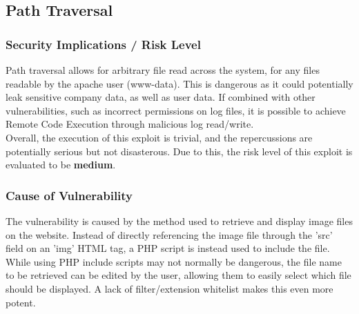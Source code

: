 \documentclass{report}
\begin{document}
\subsection{Path Traversal}
\subsubsection{Security Implications / Risk Level}
Path traversal allows for arbitrary file read across the system, for any files readable by the apache user (www-data). This is dangerous as it could potentially leak sensitive company data, as well as user data. If combined with other vulnerabilities, such as incorrect permissions on log files, it is possible to achieve Remote Code Execution through malicious log read/write.\\
Overall, the execution of this exploit is trivial, and the repercussions are potentially serious but not disasterous. Due to this, the risk level of this exploit is evaluated to be \textbf{medium}.
\subsubsection{Cause of Vulnerability}
The vulnerability is caused by the method used to retrieve and display image files on the website. Instead of directly referencing the image file through the 'src' field on an 'img' HTML tag, a PHP script is instead used to include the file.\\ 
While using PHP include scripts may not normally be dangerous, the file name to be retrieved can be edited by the user, allowing them to easily select which file should be displayed. A lack of filter/extension whitelist makes this even more potent.
\end{document}

